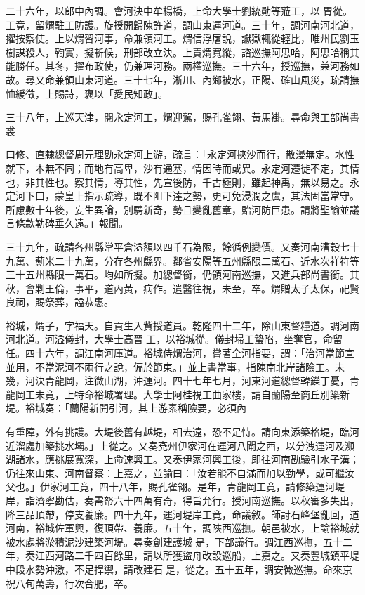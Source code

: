 \begin{pinyinscope}
二十六年，以郎中內調。會河決中牟楊橋，上命大學士劉統勛等蒞工，以胃從。工竟，留煟駐工防護。旋授開歸陳許道，調山東運河道。三十年，調河南河北道，擢按察使。上以煟習河事，命兼領河工。煟信浮屠說，讞獄輒從輕比，睢州民劉玉樹謀殺人，鞫實，擬斬候，刑部改立決。上責煟寬縱，諮巡撫阿思哈，阿思哈稱其能勝任。其冬，擢布政使，仍兼理河務。兩權巡撫。三十六年，授巡撫，兼河務如故。尋又命兼領山東河道。三十七年，淅川、內鄉被水，正陽、確山風災，疏請撫恤緩徵，上賜詩，褒以「愛民知政」。

三十八年，上巡天津，閱永定河工，煟迎駕，賜孔雀翎、黃馬褂。尋命與工部尚書裘

曰修、直隸總督周元理勘永定河上游，疏言：「永定河挾沙而行，散漫無定。水性就下，本無不同；而地有高卑，沙有通塞，情因時而或異。永定河遷徙不定，其情也，非其性也。察其情，導其性，先宣後防，千古極則，雖起神禹，無以易之。永定河下口，蒙皇上指示疏導，既不阻下達之勢，更可免浸潤之虞，其法固當常守。所慮數十年後，妄生異論，別騁新奇，勢且變亂舊章，貽河防巨患。請將聖諭並議言條款勒碑垂久遠。」報聞。

三十九年，疏請各州縣常平倉溢額以四千石為限，餘循例變價。又奏河南漕穀七十九萬、薊米二十九萬，分存各州縣界。鄰省安陽等五州縣限二萬石、近水次祥符等三十五州縣限一萬石。均如所擬。加總督銜，仍領河南巡撫，又進兵部尚書銜。其秋，會剿王倫，事平，道內黃，病作。遣醫往視，未至，卒。煟贈太子太保，祀賢良祠，賜祭葬，謚恭惠。

裕城，煟子，字福天。自貢生入貲授道員。乾隆四十二年，除山東督糧道。調河南河北道。河溢儀封，大學士高晉工，以裕城從。儀封埽工蟄陷，坐奪官，命留任。四十六年，調江南河庫道。裕城侍煟治河，嘗著全河指要，謂：「治河當節宣並用，不當泥河不兩行之說，偏於節束。」並上書當事，指陳南北岸諸險工。未幾，河決青龍岡，注微山湖，沖運河。四十七年七月，河東河道總督韓鑅丁憂，青龍岡工未竟，上特命裕城署理。大學士阿桂視工曲家樓，請自蘭陽至商丘別築新堤。裕城奏：「蘭陽新開引河，其上游素稱險要，必須內

有重障，外有挑護。大堤後舊有越堤，相去遠，恐不足恃。請向東添築格堤，臨河近溜處加築挑水壩。」上從之。又奏兗州伊家河在運河八閘之西，以分洩運河及瀕湖諸水，應挑展寬深，上命速興工。又奏伊家河興工後，即往河南勘驗引水子溝；仍往來山東、河南督察：上嘉之，並諭曰：「汝若能不自滿而加以勤學，或可繼汝父也。」伊家河工竟，四十八年，賜孔雀翎。是年，青龍岡工竟，請修築運河堤岸，詣濟寧勘估，奏需帑六十四萬有奇，得旨允行。授河南巡撫。以秋審多失出，降三品頂帶，停支養廉。四十九年，運河堤岸工竟，命議敘。師討石峰堡亂回，道河南，裕城佐軍興，復頂帶、養廉。五十年，調陜西巡撫。朝邑被水，上諭裕城就被水處將淤積泥沙建築河堤。尋奏創建護城是，下部議行。調江西巡撫，五十二年，奏江西河路二千四百餘里，請以所獲盜舟改設巡船，上嘉之。又奏豐城鎮平堤中段水勢沖激，不足捍禦，請改建石是，從之。五十五年，調安徽巡撫。命來京祝八旬萬壽，行次合肥，卒。


\end{pinyinscope}
